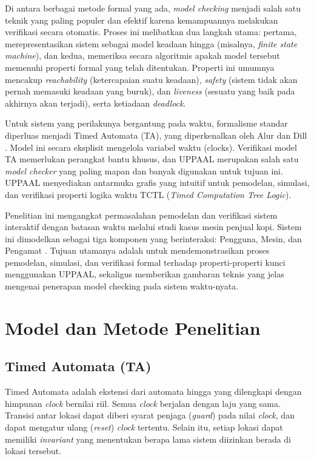 \documentclass[12pt, a4paper]{article}
\begin{document}
Di antara berbagai metode formal yang ada, \textit{model checking} menjadi salah satu teknik yang paling populer dan efektif karena kemampuannya melakukan verifikasi secara otomatis. Proses ini melibatkan dua langkah utama: pertama, merepresentasikan sistem sebagai model keadaan hingga (misalnya, \textit{finite state machine}), dan kedua, memeriksa secara algoritmis apakah model tersebut memenuhi properti formal yang telah ditentukan. Properti ini umumnya mencakup \textit{reachability} (ketercapaian suatu keadaan), \textit{safety} (sistem tidak akan pernah memasuki keadaan yang buruk), dan \textit{liveness} (sesuatu yang baik pada akhirnya akan terjadi), serta ketiadaan \textit{deadlock}.

Untuk sistem yang perilakunya bergantung pada waktu, formalisme standar diperluas menjadi Timed Automata (TA), yang diperkenalkan oleh Alur dan Dill \cite{Alur1994}. Model ini secara eksplisit mengelola variabel waktu (clocks). Verifikasi model TA memerlukan perangkat bantu khusus, dan UPPAAL merupakan salah satu \textit{model checker} yang paling mapan dan banyak digunakan untuk tujuan ini. UPPAAL menyediakan antarmuka grafis yang intuitif untuk pemodelan, simulasi, dan verifikasi properti logika waktu TCTL (\textit{Timed Computation Tree Logic}).

Penelitian ini mengangkat permasalahan pemodelan dan verifikasi sistem interaktif dengan batasan waktu melalui studi kasus mesin penjual kopi. Sistem ini dimodelkan sebagai tiga komponen yang berinteraksi: Pengguna, Mesin, dan Pengamat \cite{UppaalTutorial}. Tujuan utamanya adalah untuk mendemonstrasikan proses pemodelan, simulasi, dan verifikasi formal terhadap properti-properti kunci menggunakan UPPAAL, sekaligus memberikan gambaran teknis yang jelas mengenai penerapan model checking pada sistem waktu-nyata.

\section{Model dan Metode Penelitian}
\subsection{Timed Automata (TA)}
Timed Automata adalah ekstensi dari automata hingga yang dilengkapi dengan himpunan \textit{clock} bernilai riil. Semua \textit{clock} berjalan dengan laju yang sama. Transisi antar lokasi dapat diberi syarat penjaga (\textit{guard}) pada nilai \textit{clock}, dan dapat mengatur ulang (\textit{reset}) \textit{clock} tertentu. Selain itu, setiap lokasi dapat memiliki \textit{invariant} yang menentukan berapa lama sistem diizinkan berada di lokasi tersebut.
\end{document}
